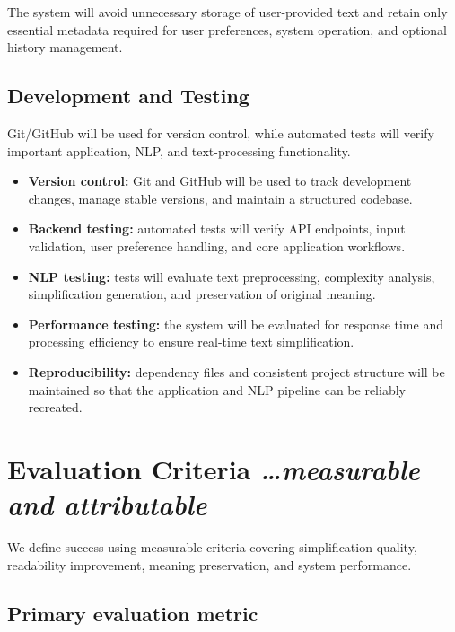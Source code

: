 \documentclass[11pt,a4paper]{article}
\newcommand{\BvrHint}[1]{%
  {\normalfont\normalsize\itshape\hfill #1}}
\begin{document}
The system will avoid unnecessary storage of user-provided text and retain only essential metadata required for user preferences, system operation, and optional history management.

\subsection{Development and Testing}

Git/GitHub will be used for version control, while automated tests will verify important application, NLP, and text-processing functionality.

\begin{itemize}[leftmargin=0.7cm]

    \item \textbf{Version control:} Git and GitHub will be used to track development changes, manage stable versions, and maintain a structured codebase.

    \item \textbf{Backend testing:} automated tests will verify API endpoints, input validation, user preference handling, and core application workflows.

    \item \textbf{NLP testing:} tests will evaluate text preprocessing, complexity analysis, simplification generation, and preservation of original meaning.

    \item \textbf{Performance testing:} the system will be evaluated for response time and processing efficiency to ensure real-time text simplification.

    \item \textbf{Reproducibility:} dependency files and consistent project structure will be maintained so that the application and NLP pipeline can be reliably recreated.

\end{itemize}

\section{Evaluation Criteria %
\BvrHint{\ldots measurable and attributable}}

We define success using measurable criteria covering simplification quality, readability improvement, meaning preservation, and system performance.

\subsection{Primary evaluation metric}
\end{document}
